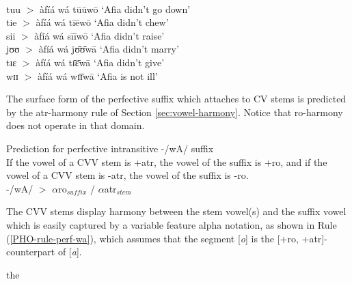 \begin{exe}
\begin{exe}
\begin{exe}
{\begin{exe}
\begin{exe}
\begin{exe}
\begin{exe}
\begin{exe}
\begin{exe}
\begin{exe}
\begin{xlist}
\begin{exe}
\begin{exe}
\begin{exe}
\begin{exe}
\begin{exe}
\begin{exe}
\begin{exe}
\begin{exe}
\begin{exe}
\begin{exe}
\begin{exe}
\begin{exe}
\begin{exe}
\\
tuu $>$ àfíá wá  tūūwō   `Afia didn't  go down'\\
tie $>$  àfíá wá   tīēwō `Afia didn't chew'\\
sii  $>$  àfíá wá  sīīwō   `Afia didn't  raise'\\
jʊʊ   $>$  àfíá wá  jʊ̄ʊ̄wā  `Afia didn't  marry'\\
tɪɛ $>$  àfíá wá tɪ̄ɛ̄wā  `Afia didn't  give'\\
wɪɪ $>$  àfíá wá  wɪ̄ɪ̄wā  `Afia is not  ill'
    

\z 
 \z

The surface form of the perfective suffix which attaches to CV stems  is 
predicted by the {\sc atr}-harmony rule of Section
\ref{sec:vowel-harmony}. Notice that  {\sc ro}-harmony does not operate
in that domain. 

\begin{Rule}\label{PHO-rule-perf-wa}{Prediction  for perfective intransitive 
-/wA/ suffix}\\
If the vowel of a CVV stem is
{\sc +atr},
the vowel of the suffix is {\sc +ro}, and if the vowel of a CVV stem is {\sc
-atr}, the vowel of the suffix is {\sc -ro}.\\
-/wA/ $>$  $\alpha${\sc ro}$_{suffix}$  /  $\alpha${\sc atr}$_{stem}$   
\end{Rule}

The CVV stems display  harmony between the stem
vowel(s) and the suffix vowel which is easily captured by a variable feature
alpha notation, as shown in Rule (\ref{PHO-rule-perf-wa}), which  assumes that 
the segment [{\it o}] is the
[{\sc +ro, +atr}]-counterpart of [{\it a}]. 

the


\end{exe}
\end{exe}
\end{exe}
\end{exe}
\end{exe}
\end{exe}
\end{exe}
\end{exe}
\end{exe}
\end{exe}
\end{exe}
\end{exe}
\end{exe}
\end{xlist}
\end{exe}
\end{exe}
\end{exe}
\end{exe}
\end{exe}
\end{exe}
\end{exe}}
\end{exe}
\end{exe}
\end{exe}
